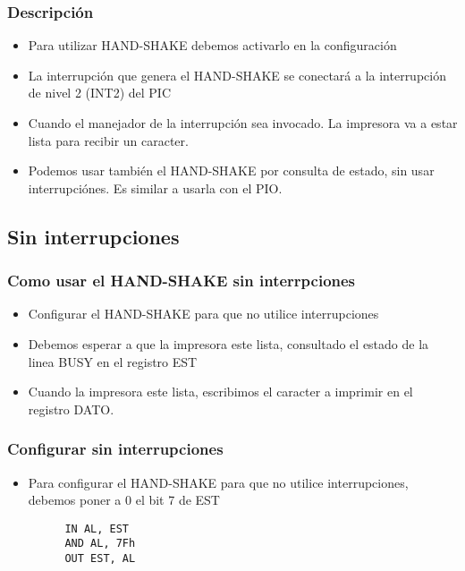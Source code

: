 \documentclass{beamer}
\begin{document}
\begin{frame}
\frametitle{Descripción}
\begin{itemize}
 \item Para utilizar HAND-SHAKE debemos activarlo en la configuración
 \item La interrupción que genera el HAND-SHAKE se conectará a la interrupción de nivel 2 (INT2) del PIC
 \item Cuando el manejador de la interrupción sea invocado. La impresora va a estar lista para recibir un caracter.
 \item Podemos usar también el HAND-SHAKE por consulta de estado, sin usar interrupciónes. Es similar a usarla con el PIO.
\end{itemize}
\end{frame}

\subsection{Sin interrupciones}
\begin{frame}
\frametitle{Como usar el HAND-SHAKE sin interrpciones}
\begin{itemize}
 \item Configurar el HAND-SHAKE para que no utilice interrupciones
 \item Debemos esperar a que la impresora este lista, consultado el estado de la linea BUSY en el registro EST
 \item Cuando la impresora este lista, escribimos el caracter a imprimir en el registro DATO.
\end{itemize}
\end{frame}

\begin{frame}[fragile]
\frametitle{Configurar sin interrupciones}
\begin{itemize}
 \item Para configurar el HAND-SHAKE para que no utilice interrupciones, debemos poner a 0 el bit 7 de EST
\end{itemize}
\begin{block}{}
 \begin{verbatim}
         IN AL, EST
         AND AL, 7Fh
         OUT EST, AL
 \end{verbatim}
\end{block}
\end{frame}
\end{document}
